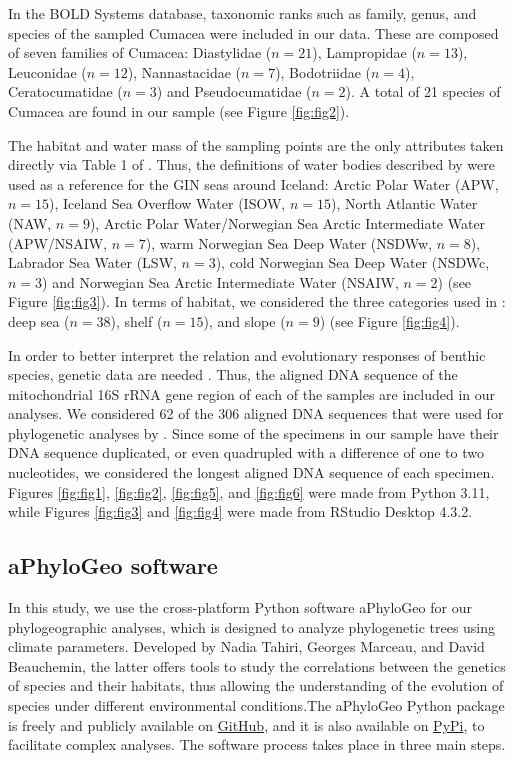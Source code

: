 In the BOLD Systems database, taxonomic ranks such as family, genus, and species of the sampled Cumacea were included in our data. These are composed of seven families of Cumacea: Diastylidae ($n=21$), Lampropidae ($n=13$), Leuconidae ($n=12$), Nannastacidae ($n=7$), Bodotriidae ($n=4$), Ceratocumatidae ($n=3$) and Pseudocumatidae ($n=2$). A total of 21 species of Cumacea are found in our sample (see Figure \ref{fig:fig2}).

The habitat and water mass of the sampling points are the only attributes taken directly via Table 1 of \cite{uhlir_adding_2021}. Thus, the definitions of water bodies described by \cite{hansen_north_2000,brix2010distribution,ostmann_marine_2014} were used as a reference for the GIN seas around Iceland: Arctic Polar Water (APW, $n=15$), Iceland Sea Overflow Water (ISOW, $n=15$), North Atlantic Water (NAW, $n=9$), Arctic Polar Water/Norwegian Sea Arctic Intermediate Water (APW/NSAIW, $n=7$), warm Norwegian Sea Deep Water (NSDWw, $n=8$), Labrador Sea Water (LSW, $n=3$), cold Norwegian Sea Deep Water (NSDWc, $n=3$) and Norwegian Sea Arctic Intermediate Water (NSAIW, $n=2$) (see Figure \ref{fig:fig3}). In terms of habitat, we considered the three categories used in \cite{uhlir_adding_2021}: deep sea ($n=38$), shelf ($n=15$), and slope ($n=9$) (see Figure \ref{fig:fig4}).

In order to better interpret the relation and evolutionary responses of benthic species, genetic data are needed \citep{wilson_speciation_1987,uhlir_adding_2021}. Thus, the aligned DNA sequence of the mitochondrial 16S rRNA gene region of each of the samples are included in our analyses. We considered 62 of the 306 aligned DNA sequences that were used for phylogenetic analyses by \cite{uhlir_adding_2021}. Since some of the specimens in our sample have their DNA sequence duplicated, or even quadrupled with a difference of one to two nucleotides, we considered the longest aligned DNA sequence of each specimen. Figures \ref{fig:fig1}, \ref{fig:fig2}, \ref{fig:fig5}, and \ref{fig:fig6} were made from Python 3.11, while Figures \ref{fig:fig3} and \ref{fig:fig4} were made from RStudio Desktop 4.3.2.

\subsection{aPhyloGeo software}

In this study, we use the cross-platform Python software aPhyloGeo for our phylogeographic analyses, which is designed to analyze phylogenetic trees using climate parameters. Developed by Nadia Tahiri, Georges Marceau, and David Beauchemin, the latter offers tools to study the correlations between the genetics of species and their habitats, thus allowing the understanding of the evolution of species under different environmental conditions.The aPhyloGeo Python package is freely and publicly available on \href{https://github.com/tahiri-lab/aPhyloGeo}{GitHub}, and it is also available on \href{https://pypi.org/project/aphylogeo/}{PyPi}, to facilitate complex analyses. The software process takes place in three main steps. 

